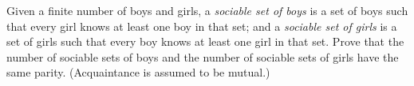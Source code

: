 Given a finite number of boys and girls, a \emph{sociable set of boys} is a set of boys such that every girl knows at least one boy in that set; and a \emph{sociable set of girls} is a set of girls such that every boy knows at least one girl in that set. Prove that the number of sociable sets of boys and the number of sociable sets of girls have the same parity. (Acquaintance is assumed to be mutual.)